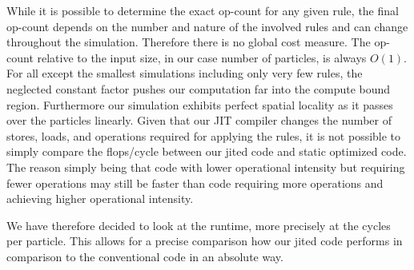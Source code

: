 While it is possible to determine the exact op-count for any given rule, the final op-count depends on the number and nature of the involved rules and can change throughout the simulation.
Therefore there is no global cost measure.
The op-count relative to the input size, in our case number of particles, is always $O(1)$. 
For all except the smallest simulations including only very few rules, the neglected constant factor pushes our computation far into the compute bound region. 
Furthermore our simulation exhibits perfect spatial locality as it passes over the particles linearly.
Given that our JIT compiler changes the number of stores, loads, and operations required for applying the rules, it is not possible to simply compare the flops/cycle between our jited code and static optimized code.
The reason simply being that code with lower operational intensity but requiring fewer operations may still be faster than code requiring more operations and achieving higher operational intensity.

We have therefore decided to look at the runtime, more precisely at the cycles per particle. This allows for a precise comparison how our jited code performs in comparison to the conventional code in an absolute way.
